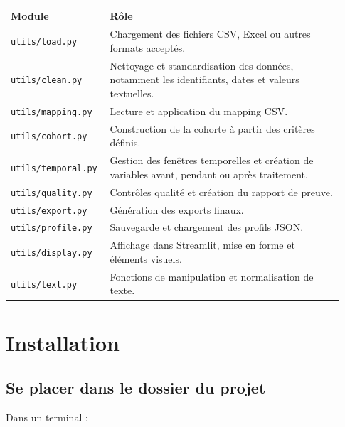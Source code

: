 \documentclass[11pt,a4paper]{article}
\newcommand{\code}[1]{\texttt{#1}}
\begin{document}
\begin{longtable}{p{0.25\linewidth} p{0.68\linewidth}}
\toprule
\textbf{Module} & \textbf{Rôle} \\
\midrule
\endhead

\code{utils/load.py} &
Chargement des fichiers CSV, Excel ou autres formats acceptés. \\

\code{utils/clean.py} &
Nettoyage et standardisation des données, notamment les identifiants, dates et valeurs textuelles. \\

\code{utils/mapping.py} &
Lecture et application du mapping CSV. \\

\code{utils/cohort.py} &
Construction de la cohorte à partir des critères définis. \\

\code{utils/temporal.py} &
Gestion des fenêtres temporelles et création de variables avant, pendant ou après traitement. \\

\code{utils/quality.py} &
Contrôles qualité et création du rapport de preuve. \\

\code{utils/export.py} &
Génération des exports finaux. \\

\code{utils/profile.py} &
Sauvegarde et chargement des profils JSON. \\

\code{utils/display.py} &
Affichage dans Streamlit, mise en forme et éléments visuels. \\

\code{utils/text.py} &
Fonctions de manipulation et normalisation de texte. \\

\bottomrule
\end{longtable}

\section{Installation}

\subsection{Se placer dans le dossier du projet}

Dans un terminal :
\end{document}
